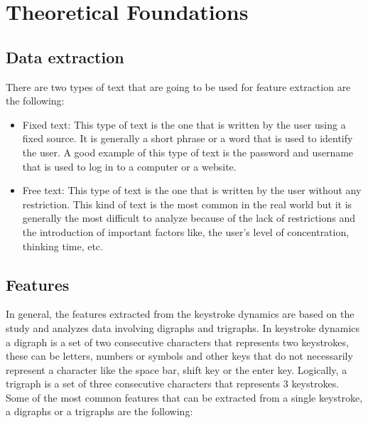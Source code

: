 \section{Theoretical Foundations}
\label{sec:theoretical-foundations}

\subsection{Data extraction}

There are two types of text that are going to be used for feature extraction are the following:

\begin{itemize}
	\item Fixed text: This type of text is the one that is written by the user using a fixed source. It is generally a short phrase or a word that is used to identify the user. A good example of this type of text is the password and username that is used to log in to a computer or a website.

	\item Free text: This type of text is the one that is written by the user without any restriction. This kind of text is the most common in the real world but it is generally the most difficult to analyze because of the lack of restrictions and the introduction of important factors like, the user's level of concentration, thinking time, etc.
\end{itemize}



\subsection{Features}

In general, the features extracted from the keystroke dynamics are based on the study and analyzes data involving digraphs and trigraphs. In keystroke dynamics a digraph is a set of two consecutive characters that represents two keystrokes, these can be letters, numbers or symbols and other keys that do not necessarily represent a character like the space bar, shift key or the enter key. Logically, a trigraph is a set of three consecutive characters that represents 3 keystrokes.
Some of the most common features that can be extracted from a single keystroke, a digraphs or a trigraphs are the following:

